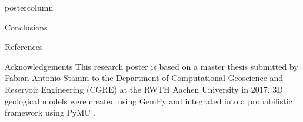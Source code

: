 \documentclass{beamer}
\begin{document}
\begin{frame}
\begin{columns}
\begin{column}{.618\textwidth}
\begin{beamercolorbox}[center]{postercolumn}
\begin{minipage}{.98\textwidth}
{\begin{myblock}{Conclusions}
	


\end{myblock}\vfill					
								
					
\begin{myblock}{References}
	\footnotesize
	
\end{myblock}

\begin{myblock}{Acknowledgements}
This research poster is based on a master thesis submitted by Fabian Antonio Stamm to the Department of Computational Geoscience and Reservoir Engineering (CGRE) at the RWTH Aachen University in 2017. 3D geological models were created using GemPy \citep{gmd-2018-61} and integrated into a probabilistic framework using PyMC \citep{salvatier2016pymc3}.
		

			
		

\end{myblock}}
\end{minipage}
\end{beamercolorbox}
\end{column}
\end{columns}
\end{frame}
\end{document}
